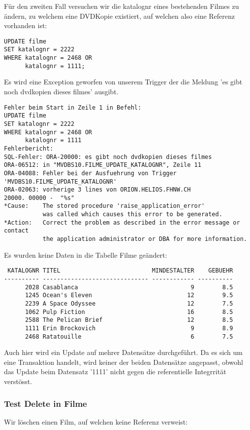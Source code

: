 \documentclass[11pt,a4paper,parskip=half]{scrartcl}
\begin{document}
Für den zweiten Fall versuchen wir die katalognr eines bestehenden Filmes zu ändern, zu welchem eine DVDKopie existiert, auf welchen also eine Referenz vorhanden ist:

\begin{lstlisting}
UPDATE filme
SET katalognr = 2222
WHERE katalognr = 2468 OR 
      katalognr = 1111;
\end{lstlisting}

Es wird eine Exception geworfen von unserem Trigger der die Meldung 'es gibt noch dvdkopien dieses filmes' ausgibt.

\begin{lstlisting}
Fehler beim Start in Zeile 1 in Befehl:
UPDATE filme
SET katalognr = 2222
WHERE katalognr = 2468 OR 
      katalognr = 1111
Fehlerbericht:
SQL-Fehler: ORA-20000: es gibt noch dvdkopien dieses filmes
ORA-06512: in "MVDBS10.FILME_UPDATE_KATALOGNR", Zeile 11
ORA-04088: Fehler bei der Ausfuehrung von Trigger 'MVDBS10.FILME_UPDATE_KATALOGNR'
ORA-02063: vorherige 3 lines von ORION.HELIOS.FHNW.CH
20000. 00000 -  "%s"
*Cause:    The stored procedure 'raise_application_error'
           was called which causes this error to be generated.
*Action:   Correct the problem as described in the error message or contact
           the application administrator or DBA for more information.
\end{lstlisting}

Es wurden keine Daten in die Tabelle Filme geändert:

\begin{lstlisting}
 KATALOGNR TITEL                          MINDESTALTER    GEBUEHR
---------- ------------------------------ ------------ ----------
      2028 Casablanca                                9        8.5 
      1245 Ocean's Eleven                           12        9.5 
      2239 A Space Odyssee                          12        7.5 
      1062 Pulp Fiction                             16        8.5 
      2588 The Pelican Brief                        12        8.5 
      1111 Erin Brockovich                           9        8.9 
      2468 Ratatouille                               6        7.5 
\end{lstlisting}

Auch hier wird ein Update auf mehrer Datensätze durchgeführt. Da es sich um eine Transaktion handelt, wird keiner der beiden Datensätze angepasst, obwohl das Update beim Datensatz '1111' nicht gegen die referentielle Integrrität verstösst.

\subsubsection{Test Delete in Filme}
Wir löschen einen Film, auf welchen keine Referenz verweist:
\end{document}
